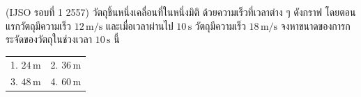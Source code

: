 (IJSO รอบที่ 1 2557) วัตถุชิ้นหนึ่งเคลื่อนที่ในหนึ่งมิติ ด้วยความเร็วที่เวลาต่าง ๆ ดังกราฟ โดยตอนแรกวัตถุมีความเร็ว $12\,\mathrm{m/s}$ และเมื่อเวลาผ่านไป $10\,\mathrm{s}$ วัตถุมีความเร็ว $18\,\mathrm{m/s}$ จงหาขนาดของการกระจัดของวัตถุในช่วงเวลา $10\,\mathrm{s}$ นี้
\begin{center}\end{center}
\par\smallskip\par\smallskip\begin{tabular}{@{}p{.48\linewidth}p{.48\linewidth}@{}}1. $24\,\mathrm{m}$ & 2. $36\,\mathrm{m}$ \\ 3. $48\,\mathrm{m}$ & 4. $60\,\mathrm{m}$\end{tabular}
